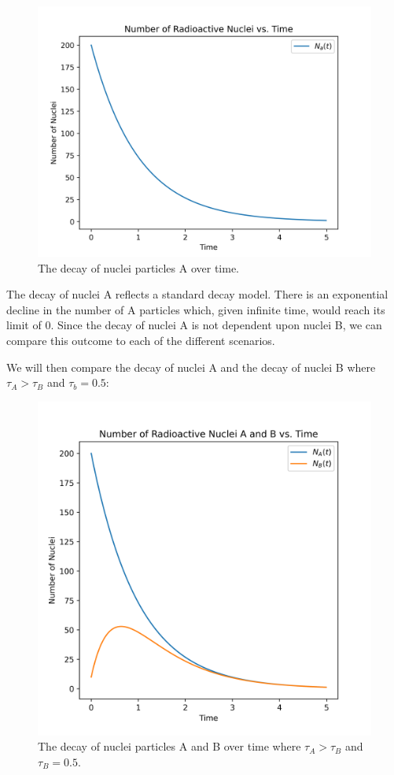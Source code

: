 \documentclass[pra,twocolumn,showpacs,amsmath,amssymb]{revtex4-2}
\begin{document}
\begin{figure}[H]
\includegraphics[scale=0.50]{Nuclei_A_0.01.png}
\caption{The decay of nuclei particles A over time.}\label{Proj1LessThan}
\end{figure}

The decay of nuclei A reflects a standard decay model. There is an exponential decline in the number of A particles which, given infinite time, would reach its limit of 0. Since the decay of nuclei A is not dependent upon nuclei B, we can compare this outcome to each of the different scenarios. 

\par We will then compare the decay of nuclei A and the decay of nuclei B where \(\tau_A > \tau_B\) and \(\tau_b = 0.5\):

\begin{figure}[H]
\includegraphics[scale=0.50]{Nuclei_AB_0.5_0.01.png}
\caption{The decay of nuclei particles A and B over time where \(\tau_A > \tau_B\) and \(\tau_B = 0.5\).}
\end{figure}
\end{document}
